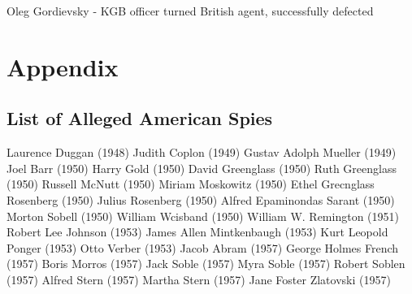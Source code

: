 \documentclass{report}
\begin{document}
\begin{refsegment}
Oleg Gordievsky - KGB officer turned British agent, successfully defected

\section{Appendix}
\subsection{List of Alleged American Spies}
\begin{multicols}{2}
\setlength{\parindent}{0ex}
Laurence Duggan (1948)\newline
Judith Coplon (1949)\newline
Gustav Adolph Mueller (1949)\newline
Joel Barr (1950)\newline
Harry Gold (1950)\newline
David Greenglass (1950)\newline
Ruth Greenglass (1950)\newline
Russell McNutt (1950)\newline
Miriam Moskowitz (1950)\newline
Ethel Grecnglass Rosenberg (1950)\newline
Julius Rosenberg (1950)\newline
Alfred Epaminondas Sarant (1950)\newline
Morton Sobell (1950)\newline
William Wcisband (1950)\newline
William W. Remington (1951)\newline
Robert Lee Johnson (1953)\newline
James Allen Mintkenbaugh (1953)\newline
Kurt Leopold Ponger (1953)\newline
Otto Verber (1953)\newline
Jacob Abram (1957)\newline
George Holmes French (1957)\newline
Boris Morros (1957)\newline
Jack Soble (1957)\newline
Myra Soble (1957)\newline
Robert Soblen (1957)\newline
Alfred Stern (1957)\newline
Martha Stern (1957)\newline
Jane Foster Zlatovski (1957)\newline

\end{multicols}
\end{refsegment}
\end{document}
